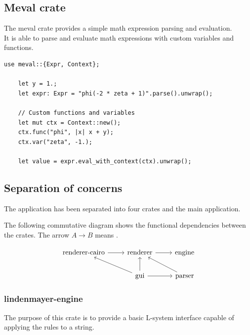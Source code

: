 \documentclass[a4paper]{article}
\begin{document}
\subsection{Meval crate}

The meval crate\cite{meval} provides a simple math expression
parsing and evaluation. \\
It is able to parse and evaluate math expressions
with custom variables and functions. 

\begin{lstlisting}[style=Rust, style=boxed]
    use meval::{Expr, Context};

    let y = 1.;
    let expr: Expr = "phi(-2 * zeta + 1)".parse().unwrap();

    // Custom functions and variables
    let mut ctx = Context::new();
    ctx.func("phi", |x| x + y);
    ctx.var("zeta", -1.);

    let value = expr.eval_with_context(ctx).unwrap();
\end{lstlisting}

\subsection{Separation of concerns}

The application has been separated into
four crates and the main application.

The following commutative diagram shows the functional dependencies between the crates.
The arrow \(A \rightarrow B\) means .

\[\begin{tikzcd}
	{\text{renderer-cairo}} & {\text{renderer}} & {\text{engine}} \\
	& {\text{gui}} & {\text{parser}}
	\arrow[from=2-2, to=2-3]
	\arrow[from=2-2, to=1-2]
	\arrow[from=2-2, to=1-1]
	\arrow[from=2-3, to=1-2]
	\arrow[from=1-2, to=1-3]
	\arrow[from=1-1, to=1-2]
\end{tikzcd}\]

\subsubsection{lindenmayer-engine}

The purpose of this crate is to provide a basic
L-system interface capable of applying the rules
to a string.
\end{document}
